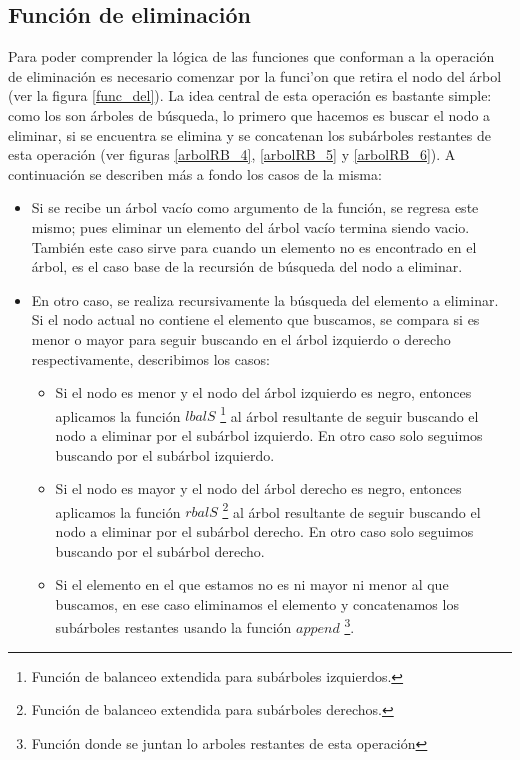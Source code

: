 \subsection{Funci\'on de eliminaci\'on}

Para poder comprender la l\'ogica de las funciones que conforman a la operaci\'on de eliminaci\'on
es necesario comenzar por la funci'on que retira el nodo del \'arbol (ver la figura \ref{func_del}).
La idea central de esta operaci\'on es bastante simple: como los {\arns} son \'arboles de búsqueda,
lo primero que hacemos es buscar el nodo a eliminar, si se encuentra se elimina y se concatenan los
subárboles restantes de esta operaci\'on (ver figuras \ref{arbolRB_4}, \ref{arbolRB_5} y
\ref{arbolRB_6}). A continuaci\'on se describen m\'as a fondo los casos de la misma:

\begin{itemize}
    \item Si se recibe un \'arbol vacío como argumento de la funci\'on, se regresa este mismo; pues
    eliminar un elemento del \'arbol vacío termina siendo vacio. También este caso sirve para
    cuando un elemento no es encontrado en el \'arbol, es el caso base de la recursi\'on de
    búsqueda del nodo a eliminar.
    \item En otro caso, se realiza recursivamente la búsqueda del elemento a eliminar. Si el nodo
    actual no contiene el elemento que buscamos, se compara si es menor o mayor para seguir
    buscando en el \'arbol izquierdo o derecho respectivamente, describimos los casos:
    \begin{itemize}
        \item Si el nodo es menor y el nodo del \'arbol izquierdo es negro, entonces aplicamos la funci\'on $lbalS$ \footnote{Funci\'on de balanceo extendida para subárboles
    izquierdos.} al \'arbol resultante de seguir buscando el nodo a eliminar por el subárbol izquierdo. 
        En otro caso solo seguimos buscando por el subárbol izquierdo.
        \item Si el nodo es mayor y el nodo del \'arbol derecho es negro, entonces aplicamos la funci\'on $rbalS$ \footnote{Funci\'on de balanceo extendida para subárboles
    derechos.} al \'arbol resultante de seguir buscando el nodo a eliminar por el subárbol derecho. 
        En otro caso solo seguimos buscando por el subárbol derecho.
        \item Si el elemento en el que estamos no es ni mayor ni menor al que buscamos, en ese
    caso eliminamos el elemento y concatenamos los subárboles restantes usando la función $append$
    \footnote{Funci\'on donde se juntan lo arboles restantes de esta operaci\'on}.
    \end{itemize}
    
\end{itemize}

